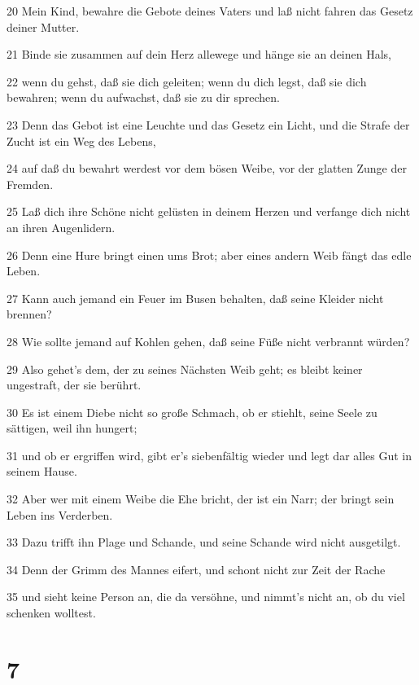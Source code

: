 \par 20 Mein Kind, bewahre die Gebote deines Vaters und laß nicht fahren das Gesetz deiner Mutter.
\par 21 Binde sie zusammen auf dein Herz allewege und hänge sie an deinen Hals,
\par 22 wenn du gehst, daß sie dich geleiten; wenn du dich legst, daß sie dich bewahren; wenn du aufwachst, daß sie zu dir sprechen.
\par 23 Denn das Gebot ist eine Leuchte und das Gesetz ein Licht, und die Strafe der Zucht ist ein Weg des Lebens,
\par 24 auf daß du bewahrt werdest vor dem bösen Weibe, vor der glatten Zunge der Fremden.
\par 25 Laß dich ihre Schöne nicht gelüsten in deinem Herzen und verfange dich nicht an ihren Augenlidern.
\par 26 Denn eine Hure bringt einen ums Brot; aber eines andern Weib fängt das edle Leben.
\par 27 Kann auch jemand ein Feuer im Busen behalten, daß seine Kleider nicht brennen?
\par 28 Wie sollte jemand auf Kohlen gehen, daß seine Füße nicht verbrannt würden?
\par 29 Also gehet's dem, der zu seines Nächsten Weib geht; es bleibt keiner ungestraft, der sie berührt.
\par 30 Es ist einem Diebe nicht so große Schmach, ob er stiehlt, seine Seele zu sättigen, weil ihn hungert;
\par 31 und ob er ergriffen wird, gibt er's siebenfältig wieder und legt dar alles Gut in seinem Hause.
\par 32 Aber wer mit einem Weibe die Ehe bricht, der ist ein Narr; der bringt sein Leben ins Verderben.
\par 33 Dazu trifft ihn Plage und Schande, und seine Schande wird nicht ausgetilgt.
\par 34 Denn der Grimm des Mannes eifert, und schont nicht zur Zeit der Rache
\par 35 und sieht keine Person an, die da versöhne, und nimmt's nicht an, ob du viel schenken wolltest.

\chapter{7}


